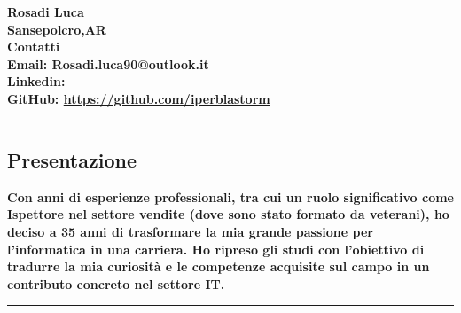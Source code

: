 \documentclass{article}
\newcommand{\spaziocorto}{\\[0.1cm]}
\newcommand{\spaziolungo}{\\[0.3cm]}
\begin{document}
\vspace{-0.2cm}
\begin{flushleft}
	\textbf{\Huge{Rosadi Luca}}
	\spaziocorto
	\textbf{\normalsize{Sansepolcro,\normalsize{AR}}}
	\spaziolungo
	\textbf{\normalsize{Contatti}}
		\spaziocorto
		\textbf{\normalsize{Email: Rosadi.luca90@outlook.it}}
		\spaziocorto
		\textbf{\normalsize{Linkedin: }}
		\spaziocorto
		\textbf{\normalsize{GitHub:} \url{https://github.com/iperblastorm}}
		\spaziocorto
\end{flushleft}

\hrule

\begin{center}
\section*{\large{Presentazione}}
\end{center}
\begin{flushleft}
	\textbf{\normalsize{Con anni di esperienze professionali, tra cui un ruolo significativo come Ispettore nel settore vendite (dove sono stato formato da veterani), ho deciso a 35 anni di trasformare la mia grande passione per l'informatica in una carriera. Ho ripreso gli studi con l'obiettivo di tradurre la mia curiosità e le competenze acquisite sul campo in un contributo concreto nel settore IT.}}
\end{flushleft}

\hrule
\end{document}
